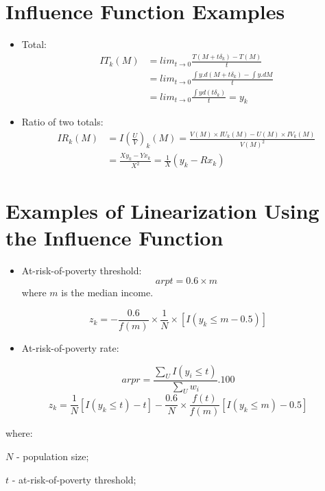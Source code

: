 \documentclass[]{book}
\providecommand{\tightlist}{%
  \setlength{\itemsep}{0pt}\setlength{\parskip}{0pt}}
\begin{document}
\section{Influence Function Examples}\label{influence-function-examples}

\begin{itemize}
\item
  Total: \[
  \begin{aligned}
  IT_k(M)&=lim_{t\rightarrow 0}\frac{T(M+t\delta_k)-T(M)}{t}\\
  &=lim_{t\rightarrow 0}\frac{\int y.d(M+t\delta_k)-\int y.dM}{t}\\
  &=lim_{t\rightarrow 0}\frac{\int yd(t\delta_k)}{t}=y_k  
  \end{aligned}
  \]
\item
  Ratio of two totals: \[
  \begin{aligned}
  IR_k(M)&=I\left(\frac{U}{V}\right)_k(M)=\frac{V(M)\times IU_k(M)-U(M)\times IV_k(M)}{V(M)^2}\\
  &=\frac{X y_k-Y x_k}{X^2}=\frac{1}{X}(y_k-Rx_k)
  \end{aligned}
  \]
\end{itemize}

\section{Examples of Linearization Using the Influence
Function}\label{examples-of-linearization-using-the-influence-function}

\begin{itemize}
\tightlist
\item
  At-risk-of-poverty threshold: \[
  arpt = 0.6\times m
  \] where \(m\) is the median income.
\end{itemize}

\[
z_k= -\frac{0.6}{f(m)}\times\frac{1}{N}\times\left[I(y_k\leq m-0.5) \right]
\]

\begin{itemize}
\tightlist
\item
  At-risk-of-poverty rate:
\end{itemize}

\[
 arpr=\frac{\sum_U I(y_i \leq t)}{\sum_U w_i}.100
\] \[
z_k=\frac{1}{N}\left[I(y_k\leq t)-t\right]-\frac{0.6}{N}\times\frac{f(t)}{f(m)}\left[I(y_k\leq m)-0.5\right]
\]

where:

\(N\) - population size;

\(t\) - at-risk-of-poverty threshold;
\end{document}
